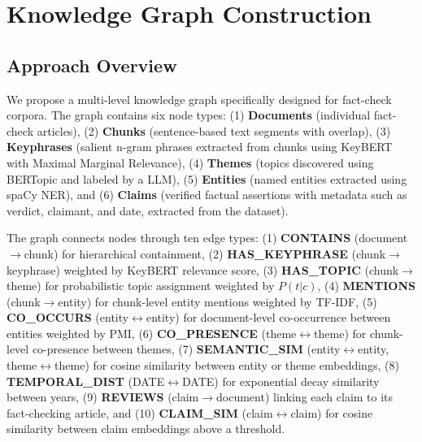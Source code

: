\documentclass[10pt]{article}
\begin{document}
\section{Knowledge Graph Construction}
\label{sec:kg_construction}

\subsection{Approach Overview}

We propose a multi-level knowledge graph specifically designed for fact-check corpora.
The graph contains six node types: (1) \textbf{Documents} (individual fact-check articles),
(2) \textbf{Chunks} (sentence-based text segments with overlap), (3) \textbf{Keyphrases}
(salient n-gram phrases extracted from chunks using KeyBERT with Maximal Marginal
Relevance), (4) \textbf{Themes} (topics discovered using BERTopic and labeled by a LLM),
(5) \textbf{Entities} (named entities extracted using spaCy NER), and (6) \textbf{Claims}
(verified factual assertions with metadata such as verdict, claimant, and date, extracted
from the dataset).


The graph connects nodes through ten edge types: (1) \textbf{CONTAINS}
(document$\to$chunk) for hierarchical containment, (2) \textbf{HAS\_KEYPHRASE}
(chunk$\to$keyphrase) weighted by KeyBERT relevance score, (3) \textbf{HAS\_TOPIC}
(chunk$\to$theme) for probabilistic topic assignment weighted by $P(t|c)$,
(4) \textbf{MENTIONS} (chunk$\to$entity) for chunk-level entity mentions weighted
by TF-IDF, (5) \textbf{CO\_OCCURS} (entity$\leftrightarrow$entity) for document-level
co-occurrence between entities weighted by PMI, (6) \textbf{CO\_PRESENCE}
(theme$\leftrightarrow$theme) for chunk-level co-presence between themes,
(7) \textbf{SEMANTIC\_SIM} (entity$\leftrightarrow$entity, theme$\leftrightarrow$theme)
for cosine similarity between entity or theme embeddings, (8) \textbf{TEMPORAL\_DIST}
(DATE$\leftrightarrow$DATE) for exponential decay similarity between years,
(9) \textbf{REVIEWS} (claim$\to$document) linking each claim to its fact-checking
article, and (10) \textbf{CLAIM\_SIM} (claim$\leftrightarrow$claim) for cosine
similarity between claim embeddings above a threshold.
\end{document}
